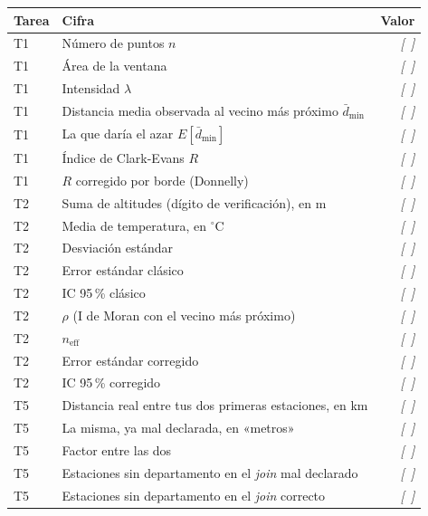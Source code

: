 \documentclass[11pt,a4paper,oneside]{article}
\newcommand{\marcador}[1]{\textcolor{grismarcador}{\textit{[#1]}}}
\begin{document}
\vspace{0.3cm}
\renewcommand{\arraystretch}{1.25}
\begingroup\setlength{\parskip}{0pt}
\begin{tabularx}{\textwidth}{@{}l X r@{}}
\toprule
\textbf{Tarea} & \textbf{Cifra} & \textbf{Valor} \\
\midrule
T1 & Número de puntos $n$                                   & \marcador{~} \\
T1 & Área de la ventana                                     & \marcador{~} \\
T1 & Intensidad $\lambda$                                   & \marcador{~} \\
T1 & Distancia media observada al vecino más próximo $\bar d_{\min}$ & \marcador{~} \\
T1 & La que daría el azar $E[\bar d_{\min}]$                & \marcador{~} \\
T1 & Índice de Clark-Evans $R$                              & \marcador{~} \\
T1 & $R$ corregido por borde (Donnelly)                     & \marcador{~} \\
\midrule
T2 & Suma de altitudes (dígito de verificación), en m       & \marcador{~} \\
T2 & Media de temperatura, en $^\circ$C                     & \marcador{~} \\
T2 & Desviación estándar                                    & \marcador{~} \\
T2 & Error estándar clásico                                 & \marcador{~} \\
T2 & IC 95\,\% clásico                                      & \marcador{~} \\
T2 & $\rho$ (I de Moran con el vecino más próximo)          & \marcador{~} \\
T2 & $n_{\text{eff}}$                                       & \marcador{~} \\
T2 & Error estándar corregido                               & \marcador{~} \\
T2 & IC 95\,\% corregido                                    & \marcador{~} \\
\midrule
T5 & Distancia real entre tus dos primeras estaciones, en km & \marcador{~} \\
T5 & La misma, ya mal declarada, en «metros»                & \marcador{~} \\
T5 & Factor entre las dos                                   & \marcador{~} \\
T5 & Estaciones sin departamento en el \emph{join} mal declarado & \marcador{~} \\
T5 & Estaciones sin departamento en el \emph{join} correcto    & \marcador{~} \\
\bottomrule
\end{tabularx}
\endgroup
\end{document}
